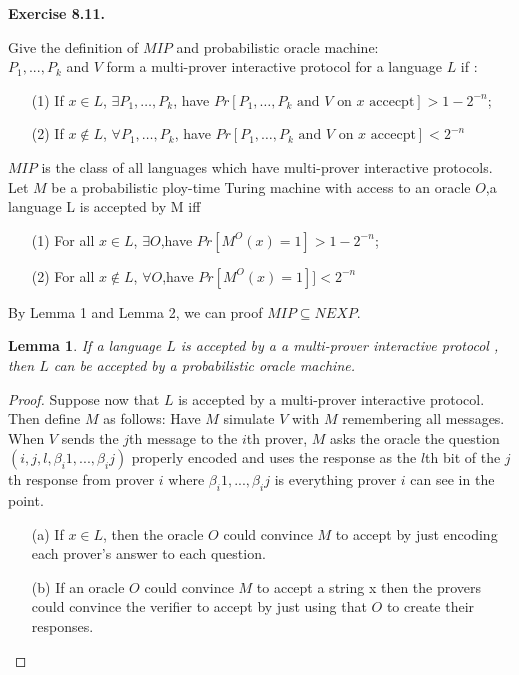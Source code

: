 \documentclass[a4paper]{article}
\newtheorem{lemma}{Lemma}
\newenvironment{exercise}[1]{
	\par
	\noindent\textbf{Exercise #1.}\quad
}{
	\par
	\bigskip
}
\begin{document}
	\begin{exercise}{8.11}
		Give the definition of $MIP$ and probabilistic oracle machine:\\
		
		$P_1,...,P_k$ and $V$ form a multi-prover interactive protocol for a language $L$ if :

		\begin{enumerate}
			\item[(1)] If $x\in L$, $\exists P_1,\ldots,P_k$, have $Pr[\text{$P_1,\ldots,P_k$ and $V$ on $x$ accecpt}]>1-2^{-n}$;
			\item[(2)] If $x\notin L$, $\forall P_1,\ldots,P_k$, have $Pr[\text{$P_1,\ldots,P_k$ and $V$ on $x$ accecpt}]<2^{-n}$
		\end{enumerate}
		
		$MIP$ is the class of all languages which have multi-prover interactive protocols.\\
		
		Let $M$ be a probabilistic ploy-time Turing machine with access to an oracle $O$,a language L is accepted by M iff 

		\begin{enumerate}
			\item[(1)] For all $x\in L$, $\exists O$,have $Pr[M^O(x)=1]>1-2^{-n}$;
			\item[(2)] For all $x\notin L$, $\forall O$,have $Pr[M^O(x)=1]]<2^{-n}$
		\end{enumerate}

		By Lemma 1 and Lemma 2, we can proof $MIP \subseteq NEXP $.\\

		\begin{lemma}
			If a language $L$ is accepted by a  a multi-prover interactive protocol , then $L$ can be accepted by a probabilistic oracle machine.
		\end{lemma}

		\begin{proof}
			Suppose now that $L$ is accepted by a multi-prover interactive protocol. Then define $M$ as follows: Have $M$ simulate $V$ with $M$ remembering all messages. When $V$ sends the $j$th message to the $i$th prover, $M$ asks the oracle the question$(i,j,l,\beta_i1,...,\beta_ij)$ properly encoded and uses the response as the $l$th bit of the $j$th response from prover $i$ where $\beta_i1,...,\beta_ij$ is everything prover $i$ can see in the point.

			\begin{itemize}
				\item[(a)] If $x\in L$, then the oracle $O$ could convince $M$ to accept by just encoding each prover's answer to each question.
				\item[(b)] If an oracle $O$ could convince $M$ to accept a string x then the provers could convince the verifier to accept by just using that $O$ to create their responses.
			\end{itemize}
		\end{proof}


\end{exercise}
\end{document}
